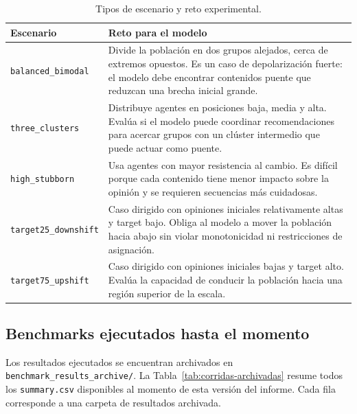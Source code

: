 \documentclass[10pt,letterpaper]{article}
\begin{document}
\begin{table}[H]
\centering
\scriptsize
\caption{Tipos de escenario y reto experimental.}
\label{tab:retos-escenarios}
\begin{tabularx}{\linewidth}{lY}
\toprule
\textbf{Escenario} & \textbf{Reto para el modelo} \\
\midrule
\texttt{balanced\_bimodal} & Divide la poblaci\'on en dos grupos alejados, cerca de extremos opuestos. Es un caso de depolarizaci\'on fuerte: el modelo debe encontrar contenidos puente que reduzcan una brecha inicial grande. \\
\texttt{three\_clusters} & Distribuye agentes en posiciones baja, media y alta. Eval\'ua si el modelo puede coordinar recomendaciones para acercar grupos con un cl\'uster intermedio que puede actuar como puente. \\
\texttt{high\_stubborn} & Usa agentes con mayor resistencia al cambio. Es dif\'icil porque cada contenido tiene menor impacto sobre la opini\'on y se requieren secuencias m\'as cuidadosas. \\
\texttt{target25\_downshift} & Caso dirigido con opiniones iniciales relativamente altas y target bajo. Obliga al modelo a mover la poblaci\'on hacia abajo sin violar monotonicidad ni restricciones de asignaci\'on. \\
\texttt{target75\_upshift} & Caso dirigido con opiniones iniciales bajas y target alto. Eval\'ua la capacidad de conducir la poblaci\'on hacia una regi\'on superior de la escala. \\
\bottomrule
\end{tabularx}
\end{table}

\subsection{Benchmarks ejecutados hasta el momento}

Los resultados ejecutados se encuentran archivados en \texttt{benchmark\_results\_archive/}. La Tabla~\ref{tab:corridas-archivadas} resume todos los \texttt{summary.csv} disponibles al momento de esta versi\'on del informe. Cada fila corresponde a una carpeta de resultados archivada.
\end{document}
